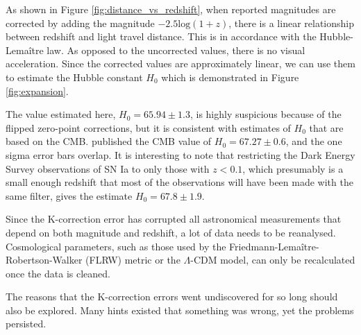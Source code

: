 \documentclass[aps,prl,reprint,amsmath,floatfix]{revtex4-2}
\begin{document}
As shown in Figure \ref{fig:distance_vs_redshift}, when reported magnitudes
are corrected by adding the magnitude $-2.5\text{log}(1+z)$, there is a linear
relationship between redshift and light travel distance. This is in accordance
with the Hubble-Lema\^{i}tre law. As opposed to the uncorrected values, there
is no visual acceleration. Since the corrected values are approximately linear,
we can use them to estimate the Hubble constant $H_0$ which is demonstrated in
Figure \ref{fig:expansion}.

The value estimated here, $H_0 = 65.94 \pm 1.3$, is highly suspicious
because of the flipped zero-point corrections, but it is consistent with
estimates of $H_0$ that are based on the CMB. \citet{planck2020} published the
CMB value of $H_0 = 67.27 \pm 0.6$, and the one sigma error bars overlap. It
is interesting to note that restricting the Dark Energy Survey observations of
SN Ia \citep{vincenzi2024} to only those with $z < 0.1$, which presumably is a
small enough redshift that most of the observations will have been made with
the same filter, gives the estimate $H_0 = 67.8 \pm 1.9$.

Since the K-correction error has corrupted all astronomical measurements that
depend on both magnitude and redshift, a lot of data needs to be reanalysed.
Cosmological parameters, such as those used by the
Friedmann-Lema\^{i}tre-Robertson-Walker (FLRW) metric or the $\Lambda$-CDM
model, can only be recalculated once the data is cleaned.

The reasons that the K-correction errors went undiscovered for so long should
also be explored. Many hints existed that something was wrong, yet the
problems persisted.


\end{document}
